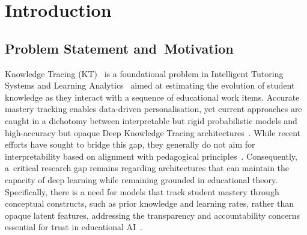 \documentclass[applsci,article,accept,moreauthors,pdftex]{Definitions/mdpi}
\begin{document}

\section{Introduction} \label{sec_intro}
\unskip

\subsection{Problem Statement and~Motivation}

{Knowledge Tracing (KT)~\citep{corbett1994knowledge} is a foundational problem in Intelligent Tutoring Systems and Learning Analytics~\citep{Romero2020} aimed at estimating the evolution of student knowledge as they interact with a sequence of educational work items. Accurate mastery tracking enables data-driven personalisation, yet current approaches are caught in a dichotomy between interpretable but rigid probabilistic models and high-accuracy but opaque Deep Knowledge Tracing architectures~\citep{abdelrahman2023knowledge, twenty_five_years_of_bkt, vaswani2017attention}. While recent efforts have sought to bridge this gap, they generally do not aim for interpretability based on alignment with pedagogical principles~\citep{bai2024survey, rudin2019stop, vonrueden2021informed}. Consequently, a~critical research gap remains regarding architectures that can maintain the capacity of deep learning while remaining grounded in educational theory. Specifically, there is a need for models that track student mastery through conceptual constructs, such as prior knowledge and learning rates, rather than opaque latent features, addressing the transparency and accountability concerns essential for trust in educational AI~\citep{Holmes2022504}}.
\end{document}
